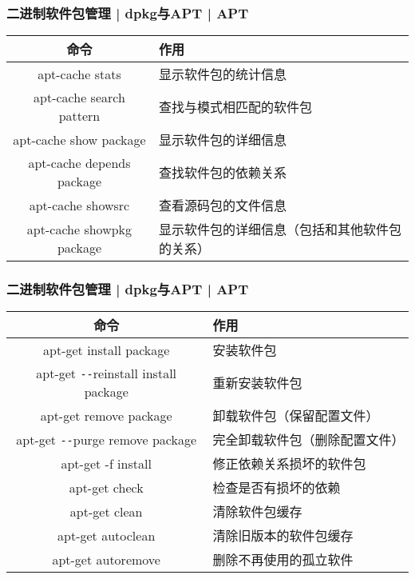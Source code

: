 \begin{frame}
  \frametitle{二进制软件包管理 | dpkg与APT | APT}
  \begin{table}
    \centering
    \begin{tabularx}{\textwidth}{cX}
      \hline
      \rowcolor{blue!50}命令 & 作用\\
      \hline
      apt-cache stats & 显示软件包的统计信息\\
      apt-cache search pattern & 查找与模式相匹配的软件包\\
      apt-cache show package & 显示软件包的详细信息\\
      apt-cache depends package & 查找软件包的依赖关系\\
      apt-cache showsrc & 查看源码包的文件信息\\
      apt-cache showpkg package & 显示软件包的详细信息（包括和其他软件包的关系）\\
      \hline
    \end{tabularx}
  \end{table}
\end{frame}

\begin{frame}[fragile]
  \frametitle{二进制软件包管理 | dpkg与APT | \alert{APT}}
  \begin{table}
    \centering
    \begin{tabularx}{\textwidth}{cX}
      \hline
      \rowcolor{blue!50}命令 & 作用\\
      \hline
      apt-get install package & 安装软件包\\
      apt-get \verb|--|reinstall install package & 重新安装软件包\\
      apt-get remove package & 卸载软件包（保留配置文件）\\
      apt-get \verb|--|purge remove package & 完全卸载软件包（删除配置文件）\\
      apt-get -f install & 修正依赖关系损坏的软件包\\
      apt-get check & 检查是否有损坏的依赖\\
      apt-get clean & 清除软件包缓存\\
      apt-get autoclean & 清除旧版本的软件包缓存\\
      apt-get autoremove & 删除不再使用的孤立软件\\
      \hline
    \end{tabularx}
  \end{table}
\end{frame}


